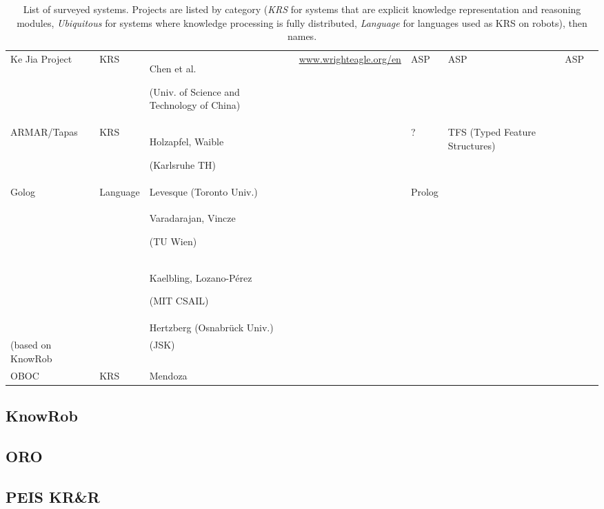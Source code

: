 \documentclass[a4paper, twocolumn]{article}
\begin{document}
\begin{landscape}
\begin{table}
\begin{center}
\begin{tabular}{p{2.2cm}p{1.6cm}p{4cm}lp{2.4cm}p{3.4cm}p{2.8cm}p{1.5cm}}
Ke Jia Project & KRS & Chen et al. \par (Univ. of Science and Technology of China) & \url{www.wrighteagle.org/en} & ASP & ASP & ASP & \cite{Chen2010} \\
ARMAR/Tapas & KRS & Holzapfel, Waible \par (Karlsruhe TH) & & ? & TFS (Typed Feature Structures) & & \cite{Holzapfel2008}\\
Golog & Language & Levesque (Toronto Univ.) & & {\sc Prolog} & & & \\
 & & Varadarajan, Vincze \par (TU Wien) & & & & & \cite{Varadarajan2011} \\
 & & Kaelbling, Lozano-Pérez \par (MIT CSAIL) & & & & & \cite{Kaelbling2011} \\
 & & Hertzberg (Osnabrück Univ.) \\
 (based on {\sc KnowRob} & & (JSK) \\
 OBOC & KRS & Mendoza & & & & & \cite{Mendoza2005} \\

\bottomrule

\end{tabular}
\end{center}
\caption{List of surveyed systems. Projects are listed by category (\emph{KRS} for systems that are explicit knowledge representation and reasoning modules, \emph{Ubiquitous} for systems where knowledge processing is fully distributed, \emph{Language} for languages used as KRS on robots), then names.}
\label{table|surveyed-systems}
\end{table}
\end{landscape}


\subsection{KnowRob}
\label{sect|knowrob}

\subsection{ORO}
\label{sect|oro}

\subsection{PEIS KR\&R}
\label{sect|peis-ecology}
\end{document}

